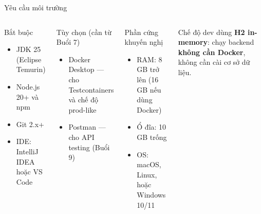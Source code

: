 \documentclass[aspectratio=169,12pt]{beamer}
\begin{document}
\begin{frame}{Yêu cầu môi trường}
  \begin{columns}
    \begin{block}{Bắt buộc}
      \begin{itemize}
        \item JDK 25 (Eclipse Temurin)
        \item Node.js 20+ và npm
        \item Git 2.x+
        \item IDE: IntelliJ IDEA hoặc VS Code
      \end{itemize}
    \end{block}

    \begin{block}{Tùy chọn (cần từ Buổi 7)}
      \begin{itemize}
        \item Docker Desktop --- cho Testcontainers và chế độ prod-like
        \item Postman --- cho API testing (Buổi 9)
      \end{itemize}
    \end{block}

    \begin{block}{Phần cứng khuyến nghị}
      \begin{itemize}
        \item RAM: 8 GB trở lên (16 GB nếu dùng Docker)
        \item Ổ đĩa: 10 GB trống
        \item OS: macOS, Linux, hoặc Windows 10/11
      \end{itemize}
    \end{block}

    \begin{alertblock}{}
      Chế độ dev dùng \textbf{H2 in-memory}: chạy backend
      \textbf{không cần Docker}, không cần cài cơ sở dữ liệu.
    \end{alertblock}
  \end{columns}
\end{frame}
\end{document}
